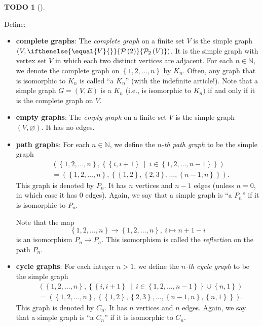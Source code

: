 \documentclass[numbers=enddot,12pt,final,onecolumn,notitlepage]{scrartcl}%
\theoremstyle{definition}
\newtheorem{quest}[theo]{TODO}
\newenvironment{todo}[1][]
{\begin{quest}[#1]\begin{leftbar}}
{\end{leftbar}\end{quest}}
\newcommand{\NN}{\mathbb{N}}
\newcommand{\powset}[2][]{\ifthenelse{\equal{#2}{}}{\mathcal{P}\left(#1\right)}{\mathcal{P}_{#1}\left(#2\right)}}
\newcommand{\set}[1]{\left\{ #1 \right\}}
\newcommand{\tup}[1]{\left( #1 \right)}
\begin{document}
\begin{todo}
Define:
\begin{itemize}
\item \textbf{complete graphs}: The \textit{complete graph} on a
finite set $V$ is the simple graph $\tup{V, \powset[2]{V}}$. It is the
simple graph with vertex set $V$ in which each two distinct vertices
are adjacent. For each $n \in \NN$, we denote the complete graph on
$\set{1,2,\ldots,n}$ by $K_n$. Often, any graph that is isomorphic to
$K_n$ is called ``a $K_n$'' (with the indefinite article!). Note that
a simple graph $G = \tup{V, E}$ is a $K_n$ (i.e., is isomorphic to
$K_n)$ if and only if it is the complete graph on $V$.

\item \textbf{empty graphs}: The \textit{empty graph} on a finite set
$V$ is the simple graph $\tup{V, \varnothing}$. It has no edges.

\item \textbf{path graphs}: For each $n \in \NN$, we define the
\textit{$n$-th path graph} to be the simple graph
\begin{align*}
& \tup{\set{1,2,\ldots,n},
       \set{\set{i, i+1} \ \mid \  i \in \set{1,2,\ldots,n-1}}
      } \\
&=
  \tup{\set{1,2,\ldots,n},
       \set{\set{1,2}, \set{2,3}, \ldots, \set{n-1,n}}
      } .
\end{align*}
This graph is denoted by $P_n$. It has $n$ vertices and $n-1$ edges
(unless $n=0$, in which case it has $0$ edges). Again, we say that a
simple graph is ``a $P_n$'' if it is isomorphic to $P_n$.

Note that the map
\[
\set{1,2,\ldots,n} \to \set{1,2,\ldots,n},
\ i \mapsto n+1-i
\]
is an isomorphism $P_n \to P_n$. This isomorphism is called the
\textit{reflection} on the path $P_n$.

\item \textbf{cycle graphs}: For each integer $n > 1$, we define the
\textit{$n$-th cycle graph} to be the simple graph
\begin{align*}
& \tup{\set{1,2,\ldots,n},
       \set{\set{i, i+1} \ \mid \  i \in \set{1,2,\ldots,n-1}}
              \cup \set{n, 1}
      } \\
&=
  \tup{\set{1,2,\ldots,n},
       \set{\set{1,2}, \set{2,3}, \ldots, \set{n-1,n}, \set{n,1}}
      } .
\end{align*}
This graph is denoted by $C_n$. It has $n$ vertices and $n$ edges.
Again, we say that a simple graph is ``a $C_n$'' if it is isomorphic
to $C_n$.


\end{itemize}
\end{todo}
\end{document}
